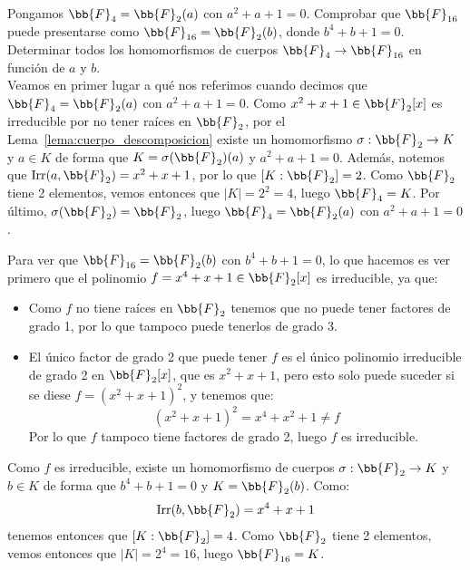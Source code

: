 \begin{ejercicio}\label{ej:F2AesF4}
    Pongamos $\bb{F}_4 = \bb{F}_2(a)$ con $a^2+a+1=0$. Comprobar que $\bb{F}_{16}$ puede presentarse como $\bb{F}_{16}=\bb{F}_2(b)$, donde $b^4+b+1=0$. Determinar todos los homomorfismos de cuerpos $\bb{F}_4\to \bb{F}_{16}$ en función de $a$ y $b$.\\

    \noindent
    Veamos en primer lugar a qué nos referimos cuando decimos que $\bb{F}_4 = \bb{F}_2(a)$ con $a^2+a+1=0$. Como $x^2+x+1\in \bb{F}_2[x]$ es irreducible por no tener raíces en $\bb{F}_2$, por el Lema~\ref{lema:cuerpo_descomposicion} existe un homomorfismo $\sigma:\bb{F}_2\to K$ y $a\in K$ de forma que $K = \sigma(\bb{F}_2)(a)$ y $a^2+a+1=0$. Además, notemos que $\Irr(a,\bb{F}_2) = x^2+x+1$, por lo que $[K:\bb{F}_2] = 2$. Como $\bb{F}_2$ tiene 2 elementos, vemos entonces que $|K| = 2^2 = 4$, luego $\bb{F}_4 = K$. Por último, $\sigma(\bb{F}_2) = \bb{F}_2$, luego $\bb{F}_4 = \bb{F}_2(a)$ con $a^2+a+1=0$.

    \noindent
    Para ver que $\bb{F}_{16} = \bb{F}_2(b)$ con $b^4+b+1=0$, lo que hacemos es ver primero que el polinomio $f = x^4+x+1\in \bb{F}_2[x]$ es irreducible, ya que:
    \begin{itemize}
        \item Como $f$ no tiene raíces en $\bb{F}_2$ tenemos que no puede tener factores de grado 1, por lo que tampoco puede tenerlos de grado 3.
        \item El único factor de grado 2 que puede tener $f$ es el único polinomio irreducible de grado 2 en $\bb{F}_2[x]$, que es $x^2+x+1$, pero esto solo puede suceder si se diese $f = {(x^2+x+1)}^{2}$, y tenemos que:
            \begin{equation*}
                {(x^2+x+1)}^{2} = x^4+x^2+1 \neq f
            \end{equation*}
            Por lo que $f$ tampoco tiene factores de grado 2, luego $f$ es irreducible.
    \end{itemize}
    Como $f$ es irreducible, existe un homomorfismo de cuerpos $\sigma:\bb{F}_2\to K$ y $b\in K$ de forma que $b^4+b+1=0$ y $K = \bb{F}_2(b)$. Como:
    \begin{equation*}
        \Irr(b,\bb{F}_2) = x^4+x+1
    \end{equation*}
    tenemos entonces que $[K:\bb{F}_2] = 4$. Como $\bb{F}_2$ tiene 2 elementos, vemos entonces que $|K| = 2^4 = 16$, luego $\bb{F}_{16} = K$.\\


\end{ejercicio}
